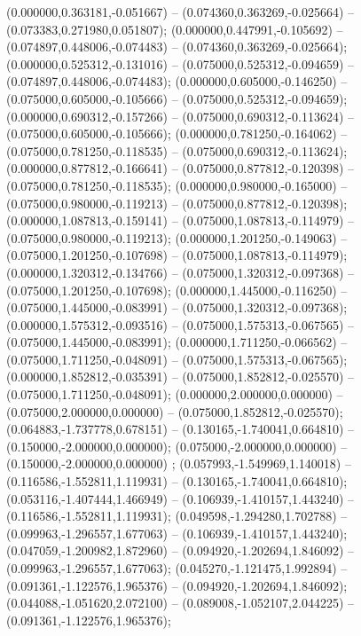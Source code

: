  (0.000000,0.363181,-0.051667) -- (0.074360,0.363269,-0.025664) -- (0.073383,0.271980,0.051807);
 (0.000000,0.447991,-0.105692) -- (0.074897,0.448006,-0.074483) -- (0.074360,0.363269,-0.025664);
 (0.000000,0.525312,-0.131016) -- (0.075000,0.525312,-0.094659) -- (0.074897,0.448006,-0.074483);
 (0.000000,0.605000,-0.146250) -- (0.075000,0.605000,-0.105666) -- (0.075000,0.525312,-0.094659);
 (0.000000,0.690312,-0.157266) -- (0.075000,0.690312,-0.113624) -- (0.075000,0.605000,-0.105666);
 (0.000000,0.781250,-0.164062) -- (0.075000,0.781250,-0.118535) -- (0.075000,0.690312,-0.113624);
 (0.000000,0.877812,-0.166641) -- (0.075000,0.877812,-0.120398) -- (0.075000,0.781250,-0.118535);
 (0.000000,0.980000,-0.165000) -- (0.075000,0.980000,-0.119213) -- (0.075000,0.877812,-0.120398);
 (0.000000,1.087813,-0.159141) -- (0.075000,1.087813,-0.114979) -- (0.075000,0.980000,-0.119213);
 (0.000000,1.201250,-0.149063) -- (0.075000,1.201250,-0.107698) -- (0.075000,1.087813,-0.114979);
 (0.000000,1.320312,-0.134766) -- (0.075000,1.320312,-0.097368) -- (0.075000,1.201250,-0.107698);
 (0.000000,1.445000,-0.116250) -- (0.075000,1.445000,-0.083991) -- (0.075000,1.320312,-0.097368);
 (0.000000,1.575312,-0.093516) -- (0.075000,1.575313,-0.067565) -- (0.075000,1.445000,-0.083991);
 (0.000000,1.711250,-0.066562) -- (0.075000,1.711250,-0.048091) -- (0.075000,1.575313,-0.067565);
 (0.000000,1.852812,-0.035391) -- (0.075000,1.852812,-0.025570) -- (0.075000,1.711250,-0.048091);
 (0.000000,2.000000,0.000000) -- (0.075000,2.000000,0.000000) -- (0.075000,1.852812,-0.025570);
 (0.064883,-1.737778,0.678151) -- (0.130165,-1.740041,0.664810) -- (0.150000,-2.000000,0.000000);
 (0.075000,-2.000000,0.000000) -- (0.150000,-2.000000,0.000000) ;
 (0.057993,-1.549969,1.140018) -- (0.116586,-1.552811,1.119931) -- (0.130165,-1.740041,0.664810);
 (0.053116,-1.407444,1.466949) -- (0.106939,-1.410157,1.443240) -- (0.116586,-1.552811,1.119931);
 (0.049598,-1.294280,1.702788) -- (0.099963,-1.296557,1.677063) -- (0.106939,-1.410157,1.443240);
 (0.047059,-1.200982,1.872960) -- (0.094920,-1.202694,1.846092) -- (0.099963,-1.296557,1.677063);
 (0.045270,-1.121475,1.992894) -- (0.091361,-1.122576,1.965376) -- (0.094920,-1.202694,1.846092);
 (0.044088,-1.051620,2.072100) -- (0.089008,-1.052107,2.044225) -- (0.091361,-1.122576,1.965376);
